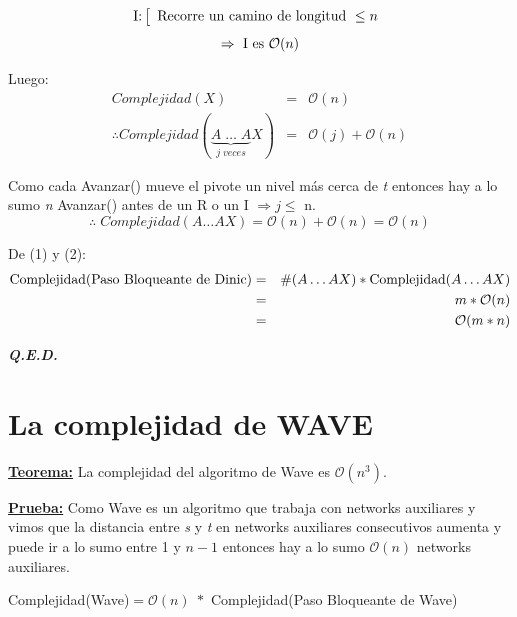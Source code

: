 \documentclass[12pt,a4paper]{report}
\newcommand{\QED}{\hfill \textit{\textbf{Q.E.D.}}}
\begin{document}
\begin{enumerate}
  					\begin{equation*}
  						\textup{I:}
  						\left[
  						\begin{array}{l}
  							\textup{Recorre un camino de longitud } \leq n
  						\end{array}
  						\right.
  					\end{equation*}
  					\[ \Rightarrow \textup{ I es } \mathcal{O}(n) \]

  					\par Luego:
  					\begin{eqnarray}
  						\nonumber Complejidad(X) &=& \mathcal{O}(n) \\
  						\nonumber \therefore Complejidad (\underbrace{A \; \dotsc \; A}_{j \; veces}X) &=&\mathcal{O}(j) + \mathcal{O}(n)
  					\end{eqnarray}

  					\par Como cada Avanzar() mueve el pivote un nivel más cerca de \textit{t} entonces hay a lo sumo \textit{n} Avanzar() antes de un R o un I $\Rightarrow j\leq$ n.
  					\[ \therefore \; Complejidad(A \dotsc AX) = \mathcal{O}(n) + \mathcal{O}(n) = \mathcal{O}(n)\]
  			\end{enumerate}

  			\par De (1) y (2):
  			\begin{eqnarray}
  				\nonumber \textup{Complejidad(Paso Bloqueante de Dinic)} &=& \# (A \dotsc A X) * \textup{Complejidad} (A \dotsc A X) \\
  				\nonumber &=& m * \mathcal{O}(n) \\
  				\nonumber &=& \mathcal{O}(m*n)
  			\end{eqnarray}

  		\QED


  	\section{La complejidad de WAVE}
  		\textbf{\underline{Teorema:}} La complejidad del algoritmo de Wave es $\mathcal{O}(n^{3})$.

  		\textbf{\underline{Prueba:}} Como Wave es un algoritmo que trabaja con networks auxiliares y vimos que la distancia entre \textit{s} y \textit{t} en networks auxiliares consecutivos aumenta y puede ir a lo sumo entre 1 y $n - 1$ entonces hay a lo sumo $\mathcal{O}(n)$ networks auxiliares.
  			\begin{center}
  				Complejidad(Wave)$ = \mathcal{O}(n) \; *$ Complejidad(Paso Bloqueante de Wave)
  			\end{center}
\end{document}
